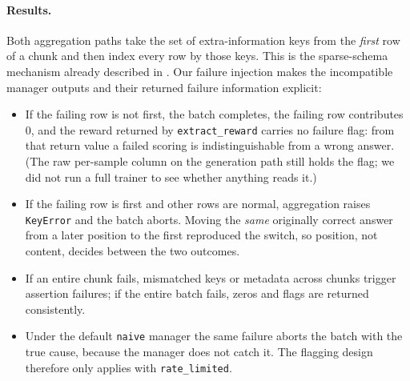 \documentclass[10pt,a4paper]{article}
\let\cite\citep
\begin{document}
\paragraph{Results.}
Both aggregation paths take the set of extra-information keys from the
\emph{first} row of a chunk and then index every row by those keys.
This is the sparse-schema mechanism already described in
\cite{verl6545,verl7151}. Our failure injection makes the incompatible
manager outputs and their returned failure information explicit:
\begin{itemize}[leftmargin=*]
\item If the failing row is not first, the batch completes, the failing row
      contributes $0$, and the reward returned by \texttt{extract\_reward}
      carries no failure flag: from that return value a failed scoring is
      indistinguishable from a wrong answer. (The raw per-sample column on
      the generation path still holds the flag; we did not run a full trainer
      to see whether anything reads it.)
\item If the failing row is first and other rows are normal, aggregation
      raises \texttt{KeyError} and the batch aborts. Moving the \emph{same}
      originally correct answer from a later position to the first reproduced
      the switch, so position, not content, decides between the two outcomes.
\item If an entire chunk fails, mismatched keys or metadata across chunks
      trigger assertion failures; if the entire batch fails, zeros and flags
      are returned consistently.
\item Under the default \texttt{naive} manager the same failure aborts the
      batch with the true cause, because the manager does not catch it. The
      flagging design therefore only applies with \texttt{rate\_limited}.
\end{itemize}
\end{document}
